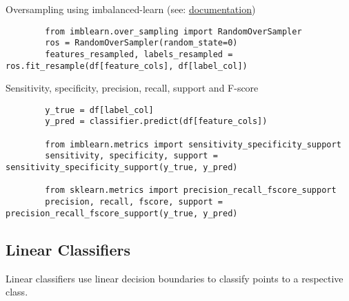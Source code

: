 \documentclass[../main.tex]{subfiles}
\begin{document}
\begin{tcolorbox}[title=Implementations for Handling Unbalanced Data Sets]
    Oversampling using imbalanced-learn (see: \href{https://imbalanced-learn.readthedocs.io}{\underline{documentation}})
    \begin{lstlisting}
        from imblearn.over_sampling import RandomOverSampler
        ros = RandomOverSampler(random_state=0)
        features_resampled, labels_resampled = ros.fit_resample(df[feature_cols], df[label_col])
        \end{lstlisting}
    
    Sensitivity, specificity, precision, recall, support and F-score
    \begin{lstlisting}
        y_true = df[label_col]
        y_pred = classifier.predict(df[feature_cols])

        from imblearn.metrics import sensitivity_specificity_support
        sensitivity, specificity, support = sensitivity_specificity_support(y_true, y_pred) 

        from sklearn.metrics import precision_recall_fscore_support
        precision, recall, fscore, support = precision_recall_fscore_support(y_true, y_pred) 

    \end{lstlisting}
\end{tcolorbox}

\subsection{Linear Classifiers}
Linear classifiers use linear decision boundaries to classify points to a respective class. 
\end{document}
